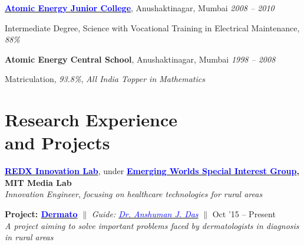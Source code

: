 \documentclass[margin,line]{res}
\newenvironment{list1}{
  \begin{list}{\ding{113}}{%
      \setlength{\itemsep}{0in}
      \setlength{\parsep}{0in} \setlength{\parskip}{0in}
      \setlength{\topsep}{0in} \setlength{\partopsep}{0in} 
      \setlength{\leftmargin}{0.17in}}}{\end{list}}
\begin{document}
\begin{resume}
\vspace*{-0.1in}

{\bf \href{http://www.aejcmumbai.ac.in/}{\textcolor{blue}{Atomic Energy Junior College}}}, Anushaktinagar, Mumbai \hfill {\it 2008 -- 2010} \\
\vspace*{-.15in}
\begin{list1}
\item[] Intermediate Degree, Science with Vocational Training in Electrical Maintenance, \textit{88\%}
\end{list1}

\vspace*{-0.1in}

{\bf Atomic Energy Central School}, Anushaktinagar, Mumbai \hfill {\it 1998 -- 2008} \\
\vspace*{-.15in}
\begin{list1}
\item[] Matriculation, \textit{93.8\%}, \textit{All India Topper in Mathematics}
\end{list1}

\section{\sc Research Experience \\ and Projects} 

{\bf  \href{http://redxmumbai.com/}{\textcolor{blue}{REDX Innovation Lab}}}, under {\bf \href{http://mitemergingworlds.com/}{\textcolor{blue}{Emerging Worlds Special Interest Group}}, MIT Media Lab} \\
{\em Innovation Engineer}, {\em focusing on healthcare technologies for rural areas} \\
\vspace*{-.05in}
\begin{list1}
\item[]\textbf{Project: \href{http://dermato.io/}{\textcolor{blue} {Dermato}}} \hfill $\|$ \hfill {\em Guide: \href{http://www.mit.edu/~ajdas}{\textcolor{blue} {Dr. Anshuman J. Das}}} \hfill $\|$ \hfill {Oct '15 -- Present} \\
\textit{A project aiming to solve important problems faced by dermatologists in diagnosis in rural areas}
\vspace{4pt}


\end{list1}
\end{resume}
\end{document}
